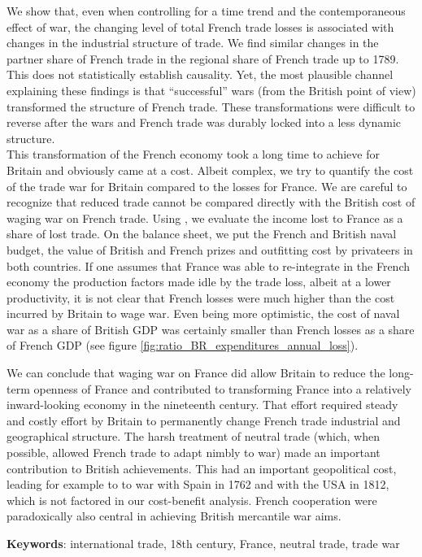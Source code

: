 \documentclass[12pt,a4paper,notitlepage,english]{article}
\begin{document}
We show that, even when controlling for a time trend and the contemporaneous effect of war, the changing level of total French trade losses is associated with changes in the industrial structure of trade. We find similar changes in the partner share of French trade in the regional share of French trade up to 1789. 
This does not statistically establish causality.
Yet, the most plausible channel explaining these findings is that ``successful'' wars (from the British point of view) transformed the structure of French trade.
These transformations were difficult to reverse after the wars and French trade was durably locked into a less dynamic structure. \\
This transformation of the French economy took a long time to achieve for Britain and obviously came at a cost. Albeit complex, we try to quantify the cost of the trade war for Britain compared to the losses for France.
We are careful to recognize that reduced trade cannot be compared directly with the British cost of waging war on French trade.
Using \citet{Daudin2005}, we evaluate the income lost to France as a share of lost trade.
On the balance sheet, we put the French and British naval budget, the value of British and French prizes and outfitting cost by privateers in both countries.
If one assumes that France was able to re-integrate in the French economy the production factors made idle by the trade loss, albeit at a lower productivity, it is not clear that French losses were much higher than the cost incurred by Britain to wage war.
Even being more optimistic, the cost of naval war as a share of British GDP was certainly smaller than French losses as a share of French GDP (see figure \ref{fig:ratio_BR_expenditures_annual_loss}). 

We can conclude that waging war on France did allow Britain to reduce the long-term openness of France and contributed to transforming France into a relatively inward-looking economy in the nineteenth century.
That effort required steady and costly effort by Britain to permanently change French trade industrial and geographical structure.
The harsh treatment of neutral trade (which, when possible, allowed French trade to adapt nimbly to war) made an important contribution to British achievements.
This had an important geopolitical cost, leading for example to to war with Spain in 1762 and with the USA in 1812, which is not factored in our cost-benefit analysis.
French cooperation were paradoxically also central in achieving British mercantile war aims.



\textbf{Keywords}: international trade, 18th century, France, neutral trade, trade war


\renewcommand{\baselinestretch}{1.0}\normalsize
\printbibliography

%
%
\end{document}
